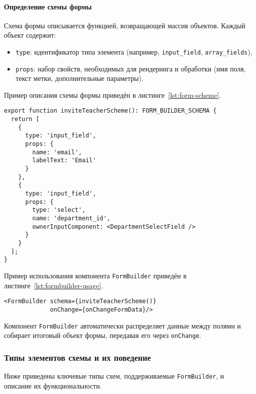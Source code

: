 \paragraph{Определение схемы формы}

Схема формы описывается функцией, возвращающей массив объектов. Каждый объект содержит:

\begin{itemize}
  \item \texttt{type}: идентификатор типа элемента (например, \texttt{input\_field}, \texttt{array\_fields}),
  \item \texttt{props}: набор свойств, необходимых для рендеринга и обработки (имя поля, текст метки, дополнительные параметры).
\end{itemize}

Пример описания схемы формы приведён в листинге~\ref{lst:form-scheme}.

\begin{lstlisting}[caption=Пример описания схемы формы,label=lst:form-scheme]
export function inviteTeacherScheme(): FORM_BUILDER_SCHEMA {
  return [
    {
      type: 'input_field',
      props: {
        name: 'email',
        labelText: 'Email'
      }
    },
    {
      type: 'input_field',
      props: {
        type: 'select',
        name: 'department_id',
        ownerInputComponent: <DepartmentSelectField />
      }
    }
  ];
}
\end{lstlisting}

Пример использования компонента \texttt{FormBuilder} приведён в листинге~\ref{lst:formbuilder-usage}.

\begin{lstlisting}[caption=Использование \texttt{FormBuilder},label=lst:formbuilder-usage]
<FormBuilder schema={inviteTeacherScheme()} 
			 onChange={onChangeFormData}/>
\end{lstlisting}

Компонент \texttt{FormBuilder} автоматически распределяет данные между полями и собирает итоговый объект формы, передавая его через \texttt{onChange}.

\subsubsection{Типы элементов схемы и их поведение}
Ниже приведены ключевые типы схем, поддерживаемые \texttt{FormBuilder}, и описание их функциональности.

